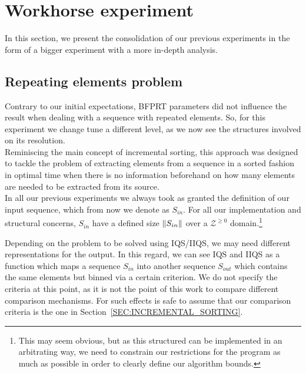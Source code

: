 \chapter{Workhorse experiment}
\label{CHAPTER:WORKHORSE_EXPERIMENT}

In this section, we present the consolidation of our previous experiments in the form of a bigger experiment with a more in-depth analysis.\\

\section{Repeating elements problem}
\label{SECTION:STACK_STRUCTURE}

Contrary to our initial expectations, BFPRT parameters did not influence the result when dealing with a sequence with repeated elements. So, for this experiment we change tune a different level, as we now see the structures involved on its resolution.\\

Reminiscing the main concept of incremental sorting, this approach was designed to tackle the problem of extracting elements from a sequence in a sorted fashion in optimal time when there is no information beforehand on how many elements are needed to be extracted from its source.\\

In all our previous experiments we always took as granted the definition of our input sequence, which from now we denote as $S_{in}$. For all our implementation and structural concerns, $S_{in}$  have a defined size $\lVert S_{in}\rVert$ over a $\mathcal{Z}^{\geq0}$ domain.\footnote{This may seem obvious, but as this structured can be implemented in an arbitrating way, we need to constrain our restrictions for the program as much as possible in order to clearly define our algorithm bounds.} 

Depending on the problem to be solved using IQS/IIQS, we may need different representations for the output. In this regard, we can see IQS and IIQS as a function which maps a sequence $S_{in}$ into another sequence $S_{out}$ which contains the same elements but binned via a certain criterion. We do not specify the criteria at this point, as it is not the point of this work to compare different comparison mechanisms. For such effects is safe to assume that our comparison criteria is the one in Section~\ref{SEC:INCREMENTAL_SORTING}.\\

